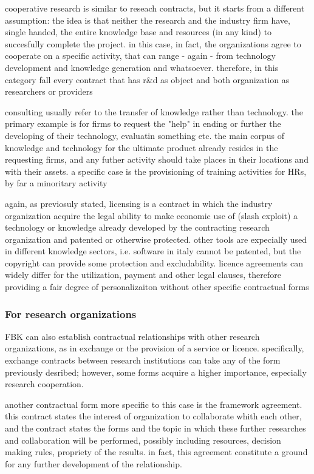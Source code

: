cooperative research is similar to reseach contracts, but it starts from a different assumption: the idea is that neither the research and the industry firm have, single handed, the entire knowledge base and resources (in any kind) to succesfully complete the project. in this case, in fact, the organizations agree to cooperate on a specific activity, that can range - again - from technology development and knowledge generation and whatsoever. therefore, in this category fall every contract that has r\&d as object and both organization as researchers or providers

consulting usually refer to the transfer of knowledge rather than technology. the primary example is for firms to request the "help" in ending or further the developing of their technology, evaluatin something etc. the main corpus of knowledge and technology for the ultimate product already resides in the requesting firms, and any futher activity should take places in their locations and with their assets. a specific case is the provisioning of training activities for HRs, by far a minoritary activity

again, as previosuly stated, licensing is a contract in which the industry organization acquire the legal ability to make economic use of (slash exploit) a technology or knowledge already developed by the contracting research organization and patented or otherwise protected. other tools are expecially used in different knowledge sectors, i.e. software in italy cannot be patented, but the copyright can provide some protection and excludability. licence agreements can widely differ for the utilization, payment and other legal clauses, therefore providing a fair degree of personalizaiton without other specific contractual forms

\subsubsection{For research organizations}

FBK can also establish contractual relationships with other research organizations, as in exchange or the provision of a service or licence. specifically, exchange contracts between research institutions can take any of the form previously desribed; however, some forms acquire a higher importance, especially research cooperation.

another contractual form more specific to this case is the framework agreement. this contract states the interest of organization to collaborate whith each other, and the contract states the forms and the topic in which these further researches and collaboration will be performed, possibly including resources, decision making rules, propriety of the results. in fact, this agreement constitute a ground for any further development of the relationship.


